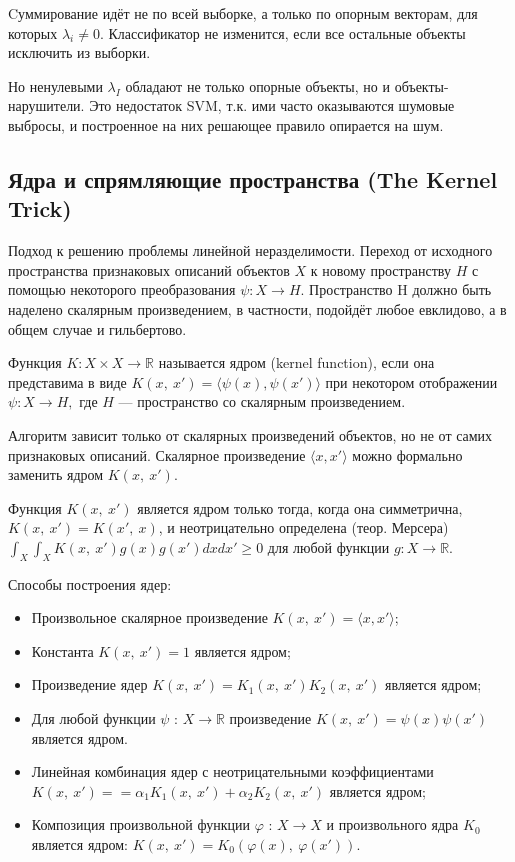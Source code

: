 \documentclass[12pt]{article}
\begin{document}
	Cуммирование идёт не по всей выборке, а только по опорным векторам, для которых $\lambda_i \neq 0$. Классификатор не изменится, если	все остальные объекты исключить из выборки. 
	
	Но ненулевыми $\lambda_I$ обладают не только опорные объекты, но и объекты-нарушители. Это недостаток SVM, т.к. ими часто оказываются шумовые выбросы, и построенное на них решающее правило опирается на шум. 
	
	\subsection{Ядра и спрямляющие пространства (The Kernel Trick)}
	
	Подход к решению проблемы линейной неразделимости. Переход от исходного пространства признаковых описаний объектов $X$ к новому пространству $H$ с помощью некоторого преобразования $\psi:X\rightarrow H$.  Пространство H должно быть наделено	скалярным произведением, в частности, подойдёт любое евклидово, а в общем случае и гильбертово.
	
	Функция $K:X\times X\rightarrow \mathbb{R}$ называется ядром (kernel function), если она	представима в виде $K(x,\ x')=\langle\psi(x), \psi(x')\rangle$ при некотором отображении $\psi:X\rightarrow H,$ где $H$ — пространство со скалярным произведением.
	
	Алгоритм зависит только от скалярных произведений объектов, но не от самих признаковых описаний. Скалярное произведение $\langle x,  x'\rangle$ можно формально заменить ядром $K(x,\ x')$.
	
	Функция $K(x,\ x')$ является ядром только тогда, когда она симметрична, $K(x,\ x')=K(x',\ x)$, и неотрицательно определена (теор. Мерсера)	
	$\int_{X}\int_{X} K(x,\ x') g(x) g(x')dx dx' \geq 0$ для любой функции $g:X\rightarrow \mathbb{R}$.
	
	Способы построения ядер:
	
	\begin{itemize}
		\item Произвольное скалярное произведение $K(x,\ x')=\langle x,  x'\rangle$;
		\item Константа $K(x,\ x')=1$ является ядром;
		\item Произведение ядер $K(x,\ x')=K_{1}(x,\ x')K_{2}(x,\ x')$ является ядром;
		\item Для любой функции $\psi$ : $X\rightarrow \mathbb{R}$ произведение $K(x,\ x')=\psi(x)\psi(x')$ является ядром.
		\item Линейная комбинация ядер с неотрицательными коэффициентами $K(x,\ x')= =\alpha_{1}K_{1}(x,\ x')+\alpha_{2}K_{2}(x,\ x')$ является ядром;
		\item Композиция произвольной функции  $\varphi$ : $X\rightarrow X$ и произвольного ядра $K_{0}$ является ядром: $K(x,\ x')=K_{0}(\varphi(x),\ \varphi(x'))$.
	\end{itemize}
\end{document}
